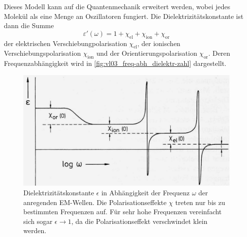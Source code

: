 	Dieses Modell kann auf die Quantenmechanik erweitert werden, wobei jedes Molekül als eine Menge an Oszillatoren fungiert. Die Dielektrizitätskonstante ist dann die Summe
	\begin{equation}
		\varepsilon' \left( \omega \right) = 1 + \chi_{\text{el}} + \chi_{\text{ion}} + \chi_{\text{or}}
	\end{equation} 
	der elektrischen Verschiebungpolarisation $ \chi_{\text{el}}$, der ionischen Verschiebungspolarisation $\chi_{\text{ion}}$ und der Orientierungspolarisation $\chi_{\text{or}}$. Deren Frequenzabhängigkeit wird in \autoref{fig:vl03_freq-abh_dielektr-zahl} dargestellt.
	\begin{figure}[H]
		\centering
		\includegraphics[width=0.7\linewidth]{figures/vl03/vl03_epsilon_frequency_dependency.png}
		\caption{Dielektrizitätskonstante $\epsilon$ in Abhängigkeit der Frequenz $\omega$ der anregenden EM-Wellen. Die Polarisationseffekte $\chi$ treten nur bis zu bestimmten Frequenzen auf. Für sehr hohe Frequenzen vereinfacht sich sogar $\epsilon \to 1$, da die Polarisationseffekt verschwindet klein werden.}
		\label{fig:vl03_freq-abh_dielektr-zahl}
	\end{figure}

